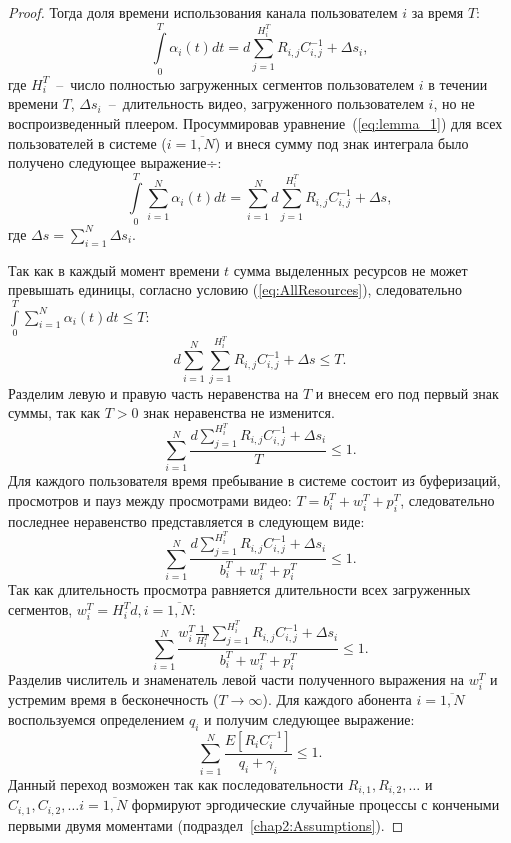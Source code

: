 \begin{proof}
Тогда доля времени использования канала пользователем $i$ за время $T$:
\begin{equation}
	\label{eq:lemma_1}
	\int\limits_{0}^{T}\alpha_i(t) dt = d\sum\limits_{j=1}^{H_i^T}R_{i,j}C_{i,j}^{-1} + \Delta s_i,
\end{equation}
где $H_i^T$~--~число полностью загруженных сегментов пользователем $i$ в течении времени $T$, $\Delta s_i$~--~длительность видео, загруженного пользователем $i$, но не воспроизведенный плеером. Просуммировав уравнение~(\ref{eq:lemma_1}) для всех пользователей в системе ($i=\overline{1,N}$) и внеся сумму под знак интеграла было получено следующее выражение÷:
\begin{equation}
	\nonumber
	\int\limits_{0}^{T}\sum\limits_{i=1}^{N}\alpha_i(t)dt = \sum\limits_{i=1}^{N}d\sum\limits_{j=1}^{H_i^T}R_{i,j}C_{i,j}^{-1} + \Delta s,
\end{equation}
где $\Delta s = \sum\limits_{i=1}^{N} \Delta s_i$.

Так как в каждый момент времени $t$ сумма выделенных ресурсов не может превышать единицы, согласно условию (\ref{eq:AllResources}), следовательно $\int\limits_{0}^{T}\sum\limits_{i=1}^{N}\alpha_i(t)dt \leq T$:
\begin{equation}
	\nonumber
	d\sum\limits_{i=1}^{N}\sum\limits_{j=1}^{H_i^T}R_{i,j}C_{i,j}^{-1} + \Delta s \leq T.
\end{equation}
Разделим левую и правую часть неравенства на $T$ и внесем его под первый знак суммы, так как $T>0$ знак неравенства не изменится.
\begin{equation}
	\nonumber
	\sum\limits_{i=1}^{N}{\frac{d\sum\limits_{j=1}^{H_i^T}R_{i,j}C_{i,j}^{-1} + \Delta s_i}{T}} \leq 1.
\end{equation}
Для каждого пользователя время пребывание в системе состоит из буферизаций, просмотров и пауз между просмотрами видео: $T = b_i^T + w_i^T + p_i^T $, следовательно последнее неравенство представляется в следующем виде:
\begin{equation}
	\nonumber
	 \sum\limits_{i=1}^{N}{\frac{d\sum\limits_{j=1}^{H_i^T}R_{i,j}C_{i,j}^{-1} + \Delta s_i}{b_i^T + w_i^T + p_i^T}} \leq 1.
\end{equation}
Так как длительность просмотра равняется длительности всех загруженных сегментов, $w_i^T = H_i^T d,i=\overline{1,N}$:
\begin{equation}
	\nonumber
	\sum\limits_{i=1}^{N}\frac{w_i^T \frac{1}{H_i^T}\sum\limits_{j=1}^{H_i^T}R_{i,j}C_{i,j}^{-1} + \Delta s_i}{b_i^T + w_i^T + p_i^T} \leq 1.
\end{equation}
Разделив числитель и знаменатель левой части полученного выражения на $w_i^T$ и устремим время в бесконечность ($T\rightarrow\infty$). Для каждого абонента $i = \overline{1,N}$ воспользуемся определением $q_i$ и получим следующее выражение:
\begin{equation}
	\nonumber
	\sum\limits_{i=1}^{N}\frac{E\left[R_{i}C_{i}^{-1}\right] }{q_i + \gamma_i} \leq 1.
\end{equation}
Данный переход возможен так как последовательности $R_{i,1}, R_{i,2}, \ldots$ и $C_{i,1}, C_{i,2}, \ldots i=\overline{1,N}$ формируют эргодические случайные процессы с кончеными первыми двумя моментами (подраздел~\ref{chap2:Assumptions}).


\end{proof}
